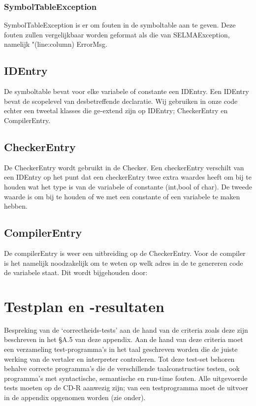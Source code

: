 \documentclass[]{article}
\begin{document}
\subsubsection{SymbolTableException}
SymbolTableException is er om fouten in de symboltable aan te geven. Deze fouten zullen vergelijkbaar worden geformat als die van SELMAException, namelijk "(line:column) ErrorMsg.

\subsection{IDEntry}
De symboltable bevat voor elke variabele of constante een IDEntry. Een IDEntry bevat de scopelevel van desbetreffende declaratie. Wij gebruiken in onze code echter een tweetal klasses die ge-extend zijn op IDEntry; CheckerEntry en CompilerEntry.

\subsection{CheckerEntry}
De CheckerEntry wordt gebruikt in de Checker. Een checkerEntry verschilt van een IDEntry op het punt dat een checkerEntry twee extra waardes heeft om bij te houden wat het type is van de variabele of constante (int,bool of char). De tweede waarde is om bij te houden of we met een constante of een variabele te maken hebben.


\subsection{CompilerEntry}
De compilerEntry is weer een uitbreiding op de CheckerEntry. Voor de compiler is het namelijk noodzakelijk om te weten op welk adres in de te genereren code de variabele staat. Dit wordt bijgehouden door:


\newpage
\section{Testplan en -resultaten}
Bespreking van de ‘correctheids-tests’ aan de hand van de criteria
zoals deze zijn beschreven in het §A.5 van deze appendix. Aan de hand van deze criteria moet
een verzameling test-programma’s in het taal geschreven worden die de juiste werking van de
vertaler en interpreter controleren. Tot deze test-set behoren behalve correcte programma’s
die de verschillende taalconstructies testen, ook programma’s met syntactische, semantische
en run-time fouten.
Alle uitgevoerde tests moeten op de CD-R aanwezig zijn; van een testprogramma moet de
uitvoer in de appendix opgenomen worden (zie onder).
\end{document}
